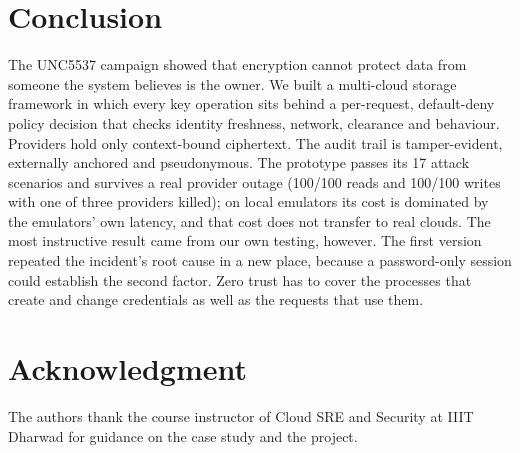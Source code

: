 \documentclass[conference]{IEEEtran}
\begin{document}
\section{Conclusion}
The UNC5537 campaign showed that encryption cannot protect data from someone the system believes is the owner. We built a multi-cloud storage framework in which every key operation sits behind a per-request, default-deny policy decision that checks identity freshness, network, clearance and behaviour. Providers hold only context-bound ciphertext. The audit trail is tamper-evident, externally anchored and pseudonymous. The prototype passes its 17 attack scenarios and survives a real provider outage (100/100 reads and 100/100 writes with one of three providers killed); on local emulators its cost is dominated by the emulators' own latency, and that cost does not transfer to real clouds. The most instructive result came from our own testing, however. The first version repeated the incident's root cause in a new place, because a password-only session could establish the second factor. Zero trust has to cover the processes that create and change credentials as well as the requests that use them.

\section*{Acknowledgment}
The authors thank the course instructor of Cloud SRE and Security at IIIT Dharwad for guidance on the case study and the project.



\end{document}
